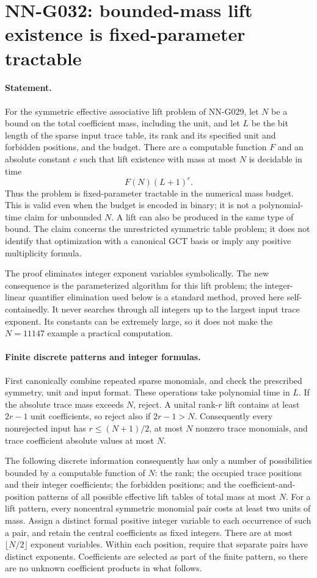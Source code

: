 \section{NN-G032: bounded-mass lift existence is fixed-parameter tractable}
\paragraph{Statement.}
For the symmetric effective associative lift problem of NN-G029,
let $N$ be a bound on the total coefficient mass, including
the unit, and let $L$ be the bit length of the sparse input
trace table, its rank and its specified unit and forbidden
positions, and the budget. There are a computable function
$F$ and an absolute constant $c$ such that lift existence
with mass at most $N$ is decidable in time
\[
                    F(N)(L+1)^c.                  \tag{G032.1}
\]
Thus the problem is fixed-parameter tractable in the numerical
mass budget. This is valid even when the budget is encoded
in binary; it is not a polynomial-time claim for unbounded
$N$. A lift can also be produced in the same type of bound.
The claim concerns the unrestricted symmetric table problem;
it does not identify that optimization with a canonical GCT
basis or imply any positive multiplicity formula.

The proof eliminates integer exponent variables symbolically.
The new consequence is the parameterized algorithm for this
lift problem; the integer-linear quantifier elimination used
below is a standard method, proved here self-containedly.
It never searches through all integers up to the largest input
trace exponent. Its constants can be extremely large, so it
does not make the $N=11147$ example a practical computation.

\paragraph{Finite discrete patterns and integer formulas.}
First canonically combine repeated sparse monomials, and
check the prescribed symmetry, unit and input format. These
operations take polynomial time in $L$. If the absolute trace
mass exceeds $N$, reject. A unital rank-$r$ lift contains at
least $2r-1$ unit coefficients, so reject also if $2r-1>N$.
Consequently every nonrejected input has $r\le(N+1)/2$,
at most $N$ nonzero trace monomials, and trace coefficient
absolute values at most $N$.

The following discrete information consequently has only
a number of possibilities bounded by a computable function
of $N$: the rank; the occupied trace positions and their
integer coefficients; the forbidden positions; and the
coefficient-and-position patterns of all possible effective
lift tables of total mass at most $N$.
For a lift pattern, every noncentral symmetric monomial pair
costs at least two units of mass. Assign a distinct formal
positive integer variable to each occurrence of such a pair,
and retain the central coefficients as fixed integers.
There are at most $\lfloor N/2\rfloor$ exponent variables.
Within each position, require that separate pairs have
distinct exponents. Coefficients are selected as part of
the finite pattern, so there are no unknown coefficient
products in what follows.

